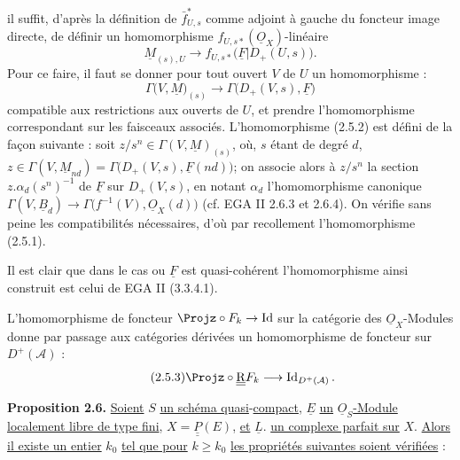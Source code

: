 
il
suffit, d'après la définition de $\bar f^{*}_{U,s}$ comme adjoint à gauche du foncteur image directe, de définir un homomorphisme $f_{U,s*}(\underline{O}_X)$-linéaire
\[
  \underline{M}_{(s),U}\longrightarrow f_{U,s*}\bigl(\underline{F}|D_+(U,s)\bigr).
\]
Pour ce faire, il faut se donner pour tout ouvert $V$ de $U$ un homomorphisme :
\begin{equation}\tag{2.5.2}
  \Gamma\bigl(V,\underline{M}\bigr)_{(s)}\longrightarrow \Gamma\bigl(D_+(V,s),\underline{F}\bigr)
\end{equation}
compatible aux restrictions aux ouverts de $U$, et prendre l'homomorphisme correspondant sur les faisceaux associés. L'homomorphisme (2.5.2) est défini de la façon suivante : soit $z/s^n\in\Gamma(V,\underline{M})_{(s)}$, où, $s$ étant de degré $d$, $z\in\Gamma(V,\underline{M}_{nd})=\Gamma\bigl(D_+(V,s),\underline{F}(nd)\bigr)$; on associe alors à $z/s^n$ la section $z.\alpha_d(s^n)^{-1}$ de $\underline{F}$ sur $D_+(V,s)$, en notant $\alpha_d$ l'homomorphisme canonique $\Gamma(V,\underline{B}_d)\longrightarrow \Gamma\bigl(f^{-1}(V),\underline{O}_X(d)\bigr)$ (cf. EGA II 2.6.3 et 2.6.4). On vérifie sans peine les compatibilités nécessaires, d'où par recollement l'homomorphisme (2.5.1).

Il est clair que dans le cas ou $\underline{F}$ est quasi-cohérent l'homomorphisme ainsi construit est celui de EGA II (3.3.4.1).

L'homomorphisme de foncteur $\Projz\circ F_k\to \operatorname{Id}$ sur la catégorie des $\underline{O}_X$-Modules donne par passage aux catégories dérivées un homomorphisme de foncteur sur $D^+(\mathcal A)$ :
\begin{equation}\tag{2.5.3}
  \Projz\circ\underline{\underline{\mathrm R}} F_k\longrightarrow \operatorname{Id}_{D^+(\mathcal A)}.
\end{equation}

\textbf{Proposition 2.6.} \uline{Soient} $S$ \uline{un schéma quasi}-\uline{compact}, $\underline{E}$ \uline{un} $\underline{O}_S$\uline{-Module localement libre de type fini}, $X=\underline{\underline{P}}(E)$, \uline{et} $\underline{L}\mathord{.}$ \uline{un complexe parfait sur} $X$. \uline{Alors} \uline{il existe un entier} $k_0$ \uline{tel que pour} $k\geq k_0$ \uline{les propriétés suivantes soient vérifiées} :
